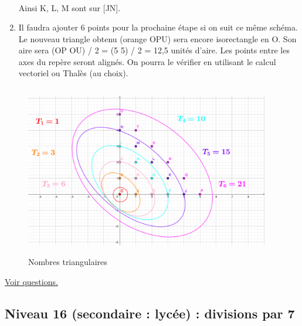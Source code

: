 \documentclass[11pt]{article}
\begin{document}
\begin{enumerate}
\begin{align*}
\end{align*}
Ainsi K, L, M sont sur [JN].
\item Il faudra ajouter 6 points pour la prochaine étape si on suit ce
même schéma. Le nouveau triangle obtenu (orange OPU)
sera encore isorectangle en O.
Son aire sera  (OP\texttimes{} OU) / 2 = (5\texttimes{} 5) / 2 = 12,5 unités
d'aire.
Les points entre les axes du repère seront alignés. On pourra le
vérifier en utilisant le calcul vectoriel ou Thalès (au choix).
\end{enumerate}

\newpage

\label{org31feee4}
\begin{figure}[htbp]
\centering
\includegraphics[width=0.95\textwidth,height=7.5cm]{./images/nb-triangulaire.png}
\caption{Nombres triangulaires}
\end{figure}




\hyperref[org70c6746]{Voir questions.}

\newpage



\subsection{Niveau 16 (secondaire : lycée) : divisions par 7}
\label{sec:org1df42ac}

\label{org28f0f91}
\end{document}
